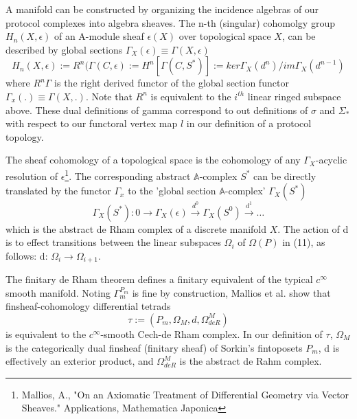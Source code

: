 \documentclass{article}
\begin{document}
A manifold can be constructed by organizing the incidence algebras of our protocol complexes into algebra sheaves. The n-th (singular) cohomolgy group $H_n(X, \epsilon)$ of an A-module sheaf $\epsilon(X)$ over topological space $X$, can be described by global sections $\Gamma_X(\epsilon) \equiv \Gamma (X, \epsilon)$
\begin{equation} \label{eq1}
H_n(X, \epsilon) := R^n(\Gamma(C,\epsilon) := H^n[\Gamma(C, S^*)] := ker\Gamma_X(d^n)/im\Gamma_X(d^{n-1})
\end{equation} \label{eq1}
where $R^n\Gamma$ is the right derived functor of the global section functor $\Gamma_x(.) \equiv \Gamma(X,.)$. Note that $R^n$ is equivalent to the $i^{th}$ linear ringed subspace above. These dual definitions of gamma correspond to out definitions of $\sigma$ and $\Sigma_*$ with respect to our functoral vertex map $l$ in our definition of a protocol topology.

The sheaf cohomology of a topological space is the cohomology of any $\Gamma_X$-acyclic resolution of $\epsilon$\footnote{Mallios, A., "On an Axiomatic Treatment of Differential Geometry via Vector
Sheaves." Applications, Mathematica Japonica }. The corresponding abstract $\mathbb{A}$-complex $S^*$ can be directly translated by the functor $\Gamma_x$ to the 'global section $\mathbb{A}$-complex' $\Gamma_X(S^*)$
\begin{equation} \label{eq1}
\Gamma_X(S^*):  0 \xrightarrow{~} \Gamma_X(\epsilon) \xrightarrow{d^0} \Gamma_X(S^0) \xrightarrow{d^1} \dots
\end{equation} \label{eq1}
which is the abstract de Rham complex of a discrete manifold $X$. The action of d is to effect transitions between the linear subspaces $\Omega_i$ of $\Omega(P)$ in (11), as follows: d: $\Omega_i \rightarrow \Omega_{i+1}$.

The finitary de Rham theorem defines a finitary equivalent of the typical $c^{\infty}$ smooth manifold. Noting $\Gamma^{P_m}_m$ is fine by construction, Mallios et al. show that finsheaf-cohomology differential tetrads
\begin{equation} \label{eq1}
\tau := (P_m, \Omega_M, d, \Omega^M_{deR})
\end{equation} \label{eq1}
is equivalent to the $c^{\infty}$-smooth Cech-de Rham complex. In our definition of $\tau$, $\Omega_M$ is the categorically dual finsheaf (finitary sheaf) of Sorkin's  fintoposets $P_m$, d is effectively an exterior product, and $ \Omega^M_{deR}$ is the abstract de Rahm complex.
\end{document}

